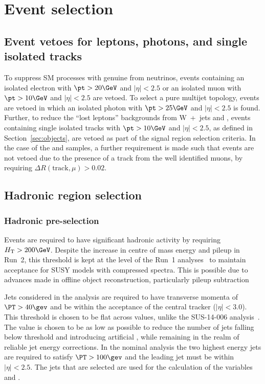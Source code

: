 \section{Event selection}
\label{sec:selection}

\subsection{Event vetoes for leptons, photons, and single isolated tracks\label{sec:vetoes}}

To suppress SM processes with genuine \met from neutrinos, events
containing an isolated electron with $\pt > 20\GeV$ and $|\eta| < 2.5$ or an isolated muon
with $\pt > 10\GeV$ and $|\eta| < 2.5$ are vetoed. To select a pure
multijet topology, events are vetoed in which an isolated
photon with $\pt > 25\GeV$ and $|\eta| < 2.5$ is
found.  Further, to reduce the ``lost leptons'' backgrounds from W~+~jets 
and \ttbar, events containing single isolated tracks with $\pt >
10\GeV$ and $|\eta| < 2.5$, as defined in
Section~\ref{sec:objects}, are vetoed as part of the signal
region selection criteria. In the case of the \mj and \mmj
samples, a further requirement is made such that events are not vetoed
due to the presence of a track from the well identified muons, by
requiring $\Delta R(\textrm{track},\mu) > 0.02$.


\subsection{Hadronic region selection}
\label{sec:hadSelection}

\subsubsection{Hadronic pre-selection}
Events are required to have significant hadronic activity by requiring
$\scalht > 200\GeV$. Despite the increase in centre of mass energy and pileup
in Run~2, this threshold is kept at the level of the Run~1 analyses~\cite{Chatrchyan:2013lya}  
to maintain acceptance for SUSY models with compressed spectra. This is possible due to advances 
made in offline object reconstruction, particularly pileup
subtraction%

Jets considered in the analysis are required to have transverse momenta of $\PT>40\gev$ and be
within the acceptance of the central tracker ($|\eta|<3.0$). This threshold is chosen
to be flat across \HT values, unlike the SUS-14-006 analysis~\cite{CMS_AN_2013-366}. The \PT value is
chosen to be as low as possible to reduce the number of jets falling below
threshold and introducing artificial \mht, while remaining in the realm of
reliable jet energy corrections. In the nominal analysis the two highest energy jets
are required to satisfy $\PT>100\gev$ and the leading jet must be within $|\eta|<2.5$. 
The jets that are selected are used for the calculation of the variables \HT and \mht.

